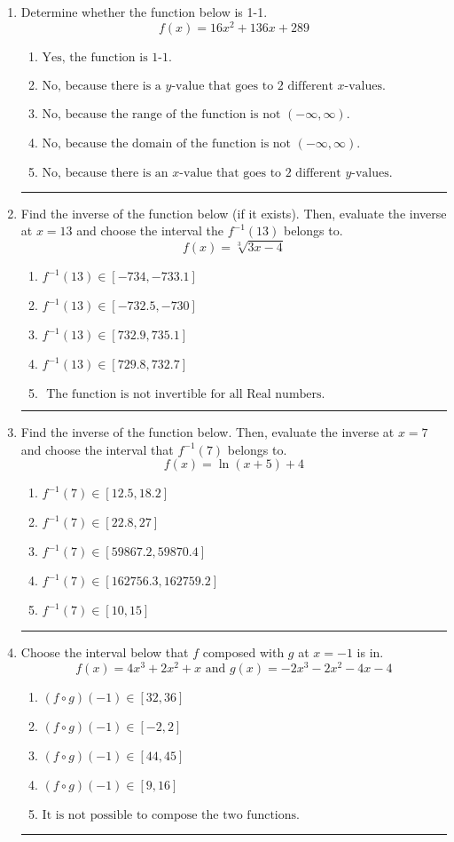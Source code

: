 \documentclass[14pt]{extbook}
\newcommand{\litem}[1]{\item#1\hspace*{-1cm}\rule{\textwidth}{0.4pt}}
\begin{document}
\begin{enumerate}
{\begin{enumerate}[label=\Alph*.]
\end{enumerate} }
\litem{
Determine whether the function below is 1-1.\[ f(x) = 16 x^2 + 136 x + 289 \]\begin{enumerate}[label=\Alph*.]
\item \( \text{Yes, the function is 1-1.} \)
\item \( \text{No, because there is a $y$-value that goes to 2 different $x$-values.} \)
\item \( \text{No, because the range of the function is not $(-\infty, \infty)$.} \)
\item \( \text{No, because the domain of the function is not $(-\infty, \infty)$.} \)
\item \( \text{No, because there is an $x$-value that goes to 2 different $y$-values.} \)

\end{enumerate} }
\litem{
Find the inverse of the function below (if it exists). Then, evaluate the inverse at $x = 13$ and choose the interval the $f^{-1}(13)$ belongs to.\[ f(x) = \sqrt[3]{3 x - 4} \]\begin{enumerate}[label=\Alph*.]
\item \( f^{-1}(13) \in [-734, -733.1] \)
\item \( f^{-1}(13) \in [-732.5, -730] \)
\item \( f^{-1}(13) \in [732.9, 735.1] \)
\item \( f^{-1}(13) \in [729.8, 732.7] \)
\item \( \text{ The function is not invertible for all Real numbers. } \)

\end{enumerate} }
\litem{
Find the inverse of the function below. Then, evaluate the inverse at $x = 7$ and choose the interval that $f^{-1}(7)$ belongs to.\[ f(x) = \ln{(x+5)}+4 \]\begin{enumerate}[label=\Alph*.]
\item \( f^{-1}(7) \in [12.5, 18.2] \)
\item \( f^{-1}(7) \in [22.8, 27] \)
\item \( f^{-1}(7) \in [59867.2, 59870.4] \)
\item \( f^{-1}(7) \in [162756.3, 162759.2] \)
\item \( f^{-1}(7) \in [10, 15] \)

\end{enumerate} }
\litem{
Choose the interval below that $f$ composed with $g$ at $x=-1$ is in.\[ f(x) = 4x^{3} +2 x^{2} +x \text{ and } g(x) = -2x^{3} -2 x^{2} -4 x -4 \]\begin{enumerate}[label=\Alph*.]
\item \( (f \circ g)(-1) \in [32, 36] \)
\item \( (f \circ g)(-1) \in [-2, 2] \)
\item \( (f \circ g)(-1) \in [44, 45] \)
\item \( (f \circ g)(-1) \in [9, 16] \)
\item \( \text{It is not possible to compose the two functions.} \)

\end{enumerate} }
\end{enumerate}
\end{document}
